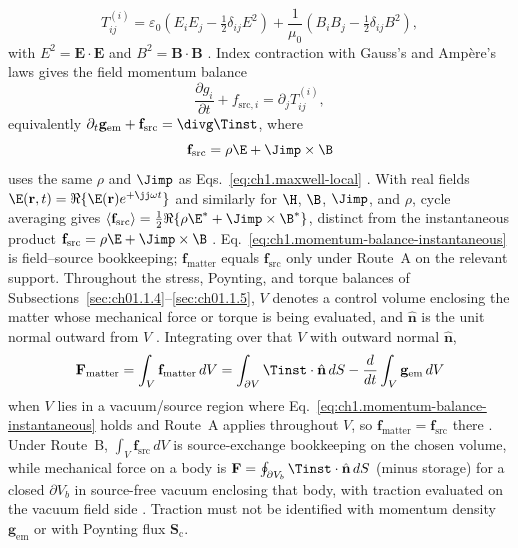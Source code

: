 \begin{equation}
\label{eq:ch1.maxwell-stress-components}
T^{(i)}_{ij}=\varepsilon_0\!\left(E_iE_j-\tfrac12\delta_{ij}E^2\right)
+\frac{1}{\mu_0}\!\left(B_iB_j-\tfrac12\delta_{ij}B^2\right),
\end{equation}
with $E^2=\mathbf{E}\cdot\mathbf{E}$ and $B^2=\mathbf{B}\cdot\mathbf{B}$ \cite{maxwell1873,stratton1941}.
Index contraction with Gauss's and Amp\`ere's laws gives the field momentum balance
\begin{equation}
\label{eq:ch1.momentum-balance-instantaneous}
\frac{\partial g_{i}}{\partial t}+f_{\mathrm{src},i}=\partial_j T^{(i)}_{ij},
\end{equation}
equivalently $\partial_t\mathbf{g}_{\mathrm{em}}+\mathbf{f}_{\mathrm{src}}=\divg\Tinst$, where
\begin{equation}
\label{eq:ch1.maxwell-source-force}
\mathbf{f}_{\mathrm{src}}=\rho\E+\Jimp\times\B
\end{equation}
uses the same $\rho$ and $\Jimp$ as Eqs.~\eqref{eq:ch1.maxwell-local} \cite{maxwell1873,jackson1999}. With real fields $\E(\mathbf{r},t)=\Re\{\E(\mathbf{r})e^{+\jj\omega t}\}$ and similarly for $\H$, $\B$, $\Jimp$, and $\rho$, cycle averaging gives
$\langle\mathbf{f}_{\mathrm{src}}\rangle=\tfrac12\Re\{\rho\E^*+\Jimp\times\B^*\}$,
distinct from the instantaneous product $\mathbf{f}_{\mathrm{src}}=\rho\E+\Jimp\times\B$ \cite{stratton1941}. Eq.~\eqref{eq:ch1.momentum-balance-instantaneous} is field--source bookkeeping; $\mathbf{f}_{\mathrm{matter}}$ equals $\mathbf{f}_{\mathrm{src}}$ only under Route~A on the relevant support.
Throughout the stress, Poynting, and torque balances of
Subsections~\ref{sec:ch01.1.4}--\ref{sec:ch01.1.5}, $V$ denotes a control volume
enclosing the matter whose mechanical force or torque is being evaluated, and
$\hat{\mathbf{n}}$ is the unit normal outward from $V$ \cite{stratton1941}.
Integrating over that $V$ with outward normal $\hat{\mathbf{n}}$,
\begin{equation}
\label{eq:ch1.momentum-integral-balance}
\mathbf{F}_{\mathrm{matter}}
=\int_V \mathbf{f}_{\mathrm{matter}}\,dV
=\int_{\partial V}\Tinst\cdot\hat{\mathbf{n}}\,dS
-\frac{d}{dt}\int_V \mathbf{g}_{\mathrm{em}}\,dV
\end{equation}
when $V$ lies in a vacuum/source region where Eq.~\eqref{eq:ch1.momentum-balance-instantaneous} holds and Route~A applies throughout $V$, so $\mathbf{f}_{\mathrm{matter}}=\mathbf{f}_{\mathrm{src}}$ there \cite{stratton1941}. Under Route~B, $\int_V \mathbf{f}_{\mathrm{src}}\,dV$ is source-exchange bookkeeping on the chosen volume, while mechanical force on a body is $\mathbf{F}=\oint_{\partial V_b}\Tinst\cdot\hat{\mathbf{n}}\,dS$ (minus storage) for a closed $\partial V_b$ in source-free vacuum enclosing that body, with traction evaluated on the vacuum field side \cite{stratton1941,harrington2001}. Traction must not be identified with momentum density $\mathbf{g}_{\mathrm{em}}$ or with Poynting flux $\mathbf{S}_\mathrm{c}$.

